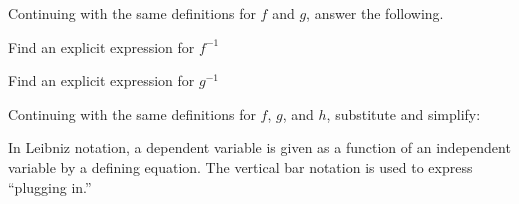 Continuing with the same definitions for $f$ and $g$, answer the following.

\begin{ProblemSet}[continue,pencil space=3.5in]
 \begin{Problem}
  Find an explicit expression for $f^{-1}$
 \end{Problem}
 \begin{Problem}
  Find an explicit expression for $g^{-1}$
 \end{Problem}
\end{ProblemSet}


\newpage
{}

Continuing with the same definitions for $f$, $g$, and $h$, substitute and simplify:

\begin{multicols}{2}
 \begin{ProblemSet}[continue,pencil space=0in]
 \end{ProblemSet}
\end{multicols}

\newpage


In Leibniz notation, a dependent variable is given as a function of an independent variable by a defining equation.
The vertical bar notation is used to express ``plugging in.''

